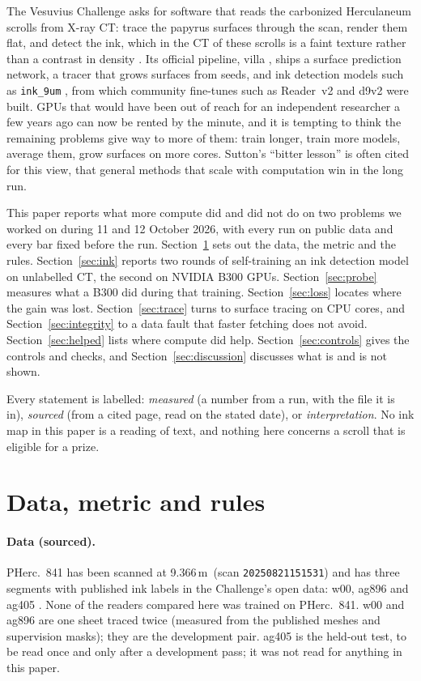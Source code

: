 \documentclass[11pt]{article}
\newcommand{\um}{\,\textmu m}
\begin{document}
The Vesuvius Challenge \cite{prizes} asks for software that reads the carbonized Herculaneum scrolls from X-ray CT: trace the papyrus surfaces through the scan, render them flat, and detect the ink, which in the CT of these scrolls is a faint texture rather than a contrast in density \cite{educelab}. Its official pipeline, villa \cite{villa}, ships a surface prediction network, a tracer that grows surfaces from seeds, and ink detection models such as \texttt{ink\_9um} \cite{ink9um}, from which community fine-tunes such as Reader~v2 \cite{readerv2} and d9v2 \cite{d9v2} were built. GPUs that would have been out of reach for an independent researcher a few years ago can now be rented by the minute, and it is tempting to think the remaining problems give way to more of them: train longer, train more models, average them, grow surfaces on more cores. Sutton's ``bitter lesson'' \cite{sutton} is often cited for this view, that general methods that scale with computation win in the long run.

This paper reports what more compute did and did not do on two problems we worked on during 11 and 12 October 2026, with every run on public data and every bar fixed before the run. Section~\ref{sec:setting} sets out the data, the metric and the rules. Section~\ref{sec:ink} reports two rounds of self-training an ink detection model on unlabelled CT, the second on NVIDIA B300 GPUs. Section~\ref{sec:probe} measures what a B300 did during that training. Section~\ref{sec:loss} locates where the gain was lost. Section~\ref{sec:trace} turns to surface tracing on CPU cores, and Section~\ref{sec:integrity} to a data fault that faster fetching does not avoid. Section~\ref{sec:helped} lists where compute did help. Section~\ref{sec:controls} gives the controls and checks, and Section~\ref{sec:discussion} discusses what is and is not shown.

Every statement is labelled: \emph{measured} (a number from a run, with the file it is in), \emph{sourced} (from a cited page, read on the stated date), or \emph{interpretation}. No ink map in this paper is a reading of text, and nothing here concerns a scroll that is eligible for a prize.

\section{Data, metric and rules}\label{sec:setting}

\paragraph{Data (sourced).} PHerc.~841 has been scanned at 9.366\um\ (scan \texttt{20250821151531}) and has three segments with published ink labels in the Challenge's open data: w00, ag896 and ag405 \cite{opendata}. None of the readers compared here was trained on PHerc.~841. w00 and ag896 are one sheet traced twice (measured from the published meshes and supervision masks); they are the development pair. ag405 is the held-out test, to be read once and only after a development pass; it was not read for anything in this paper.
\end{document}
